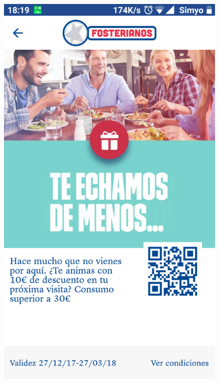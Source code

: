 \documentclass[twoside]{report}
\begin{document}
\begin{figure}[H]
\begin{center}
\includegraphics[scale=0.25]{images/restaurantes/foster1.png}

\end{center}
\end{figure}
\end{document}
